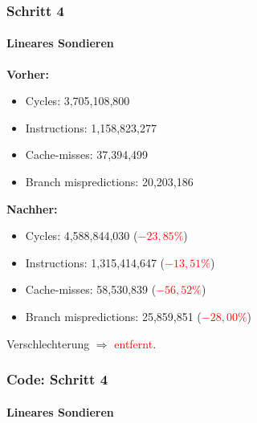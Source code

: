 \documentclass{beamer}
\newcommand{\fail}[1]{\textcolor{red}{#1}}
\begin{document}
  \begin{frame}
  	\frametitle{Schritt 4}
  	\framesubtitle{Lineares Sondieren}
  	\textbf{Vorher:}
  	\begin{itemize}
			\item Cycles: 3,705,108,800 \\
			\item Instructions: 1,158,823,277\\
			\item Cache-misses: 37,394,499\\
			\item Branch mispredictions: 20,203,186\\
		\end{itemize}	
		
		\textbf{Nachher:}
		\begin{itemize}
			\item Cycles: 4,588,844,030 (\fail{$- 23,85 \%$})\\
			\item Instructions: 1,315,414,647 (\fail{$- 13,51 \%$})\\
			\item Cache-misses: 58,530,839 (\fail{$- 56,52 \%$})\\
			\item Branch mispredictions: 25,859,851 (\fail{$- 28,00 \%$})\\
		\end{itemize}	
		Verschlechterung $\Rightarrow$ \fail{entfernt}.
  \end{frame}
  
  \begin{frame}
  	\frametitle{Code: Schritt 4}
  	\framesubtitle{Lineares Sondieren}
		\sLinear
  \end{frame}
    
\end{document}
